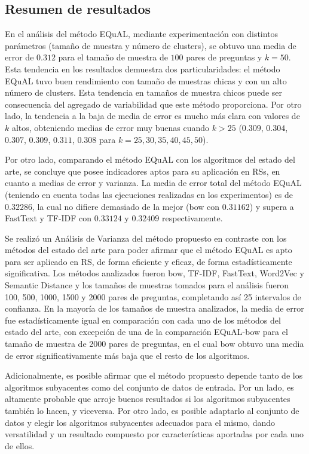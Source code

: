 \subsection{Resumen de resultados}

En el análisis del método EQuAL, mediante experimentación con distintos parámetros (tamaño de muestra y número de clusters), se obtuvo una media de error de \(0.312\) para el tamaño de muestra de \(100\) pares de preguntas y \(k = 50\). Esta tendencia en los resultados demuestra dos particularidades: el método EQuAL tuvo buen rendimiento con tamaño de muestras chicas y con un alto número de clusters. Esta tendencia en tamaños de muestra chicos puede ser consecuencia del agregado de variabilidad que este método proporciona. Por otro lado, la tendencia a la baja de media de error es mucho más clara con valores de \(k\) altos, obteniendo medias de error muy buenas cuando \(k > 25\) (\(0.309\), \(0.304\), \(0.307\), \(0.309\), \(0.311\), \(0.308\) para  \(k = 25, 30, 35, 40, 45, 50\)).

\bigskip Por otro lado, comparando el método EQuAL con los algoritmos del estado del arte, se concluye que posee indicadores aptos para su aplicación en RSs, en cuanto a medias de error y varianza. La media de error total del método EQuAL (teniendo en cuenta todas las ejecuciones realizadas en los experimentos) es de \(0.32286\), la cual no difiere demasiado de la mejor (bow con \(0.31162\)) y supera a FastText y TF-IDF con \(0.33124\) y \(0.32409\) respectivamente.

\bigskip Se realizó un Análisis de Varianza del método propuesto en contraste con los métodos del estado del arte para poder afirmar que el método EQuAL es apto para ser aplicado en RS, de forma eficiente y eficaz, de forma estadísticamente significativa. Los métodos analizados fueron bow, TF-IDF, FastText, Word2Vec y Semantic Distance y los tamaños de muestras tomados para el análisis fueron 100, 500, 1000, 1500 y 2000 pares de preguntas, completando así 25 intervalos de confianza. En la mayoría de los tamaños de muestra analizados, la media de error fue estadísticamente igual en comparación con cada uno de los métodos del estado del arte, con excepción de una de la comparación EQuAL-bow para el tamaño de muestra de 2000 pares de preguntas, en el cual bow obtuvo una media de error significativamente más baja que el resto de los algoritmos.

\bigskip Adicionalmente, es posible afirmar que el método propuesto depende tanto de los algoritmos subyacentes como del conjunto de datos de entrada. Por un lado, es altamente probable que arroje buenos resultados si los algoritmos subyacentes también lo hacen, y viceversa. Por otro lado, es posible adaptarlo al conjunto de datos y elegir los algoritmos subyacentes adecuados para el mismo, dando versatilidad y un resultado compuesto por características aportadas por cada uno de ellos.

